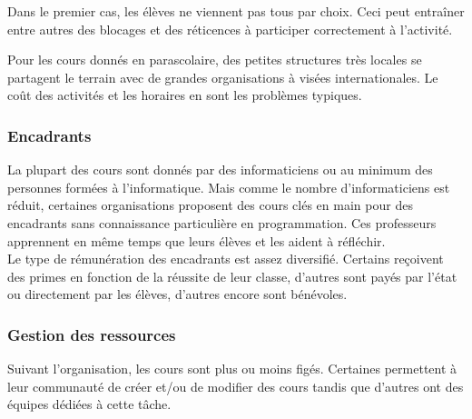 Dans le premier cas, les élèves ne viennent pas tous par choix. Ceci peut entraîner entre autres des blocages et des réticences à participer correctement à l'activité.

Pour les cours donnés en parascolaire, des petites structures très locales se partagent le terrain avec de grandes organisations à visées internationales. Le coût des activités et les horaires en sont les problèmes typiques.

\subsubsection{Encadrants}
La plupart des cours sont donnés par des informaticiens ou au minimum des personnes formées à l'informatique. Mais comme le nombre d'informaticiens est réduit, certaines organisations proposent des cours clés en main pour des encadrants sans connaissance particulière en programmation. Ces professeurs apprennent en même temps que leurs élèves et les aident à réfléchir.\\

Le type de rémunération des encadrants est assez diversifié. Certains reçoivent des primes en fonction de la réussite de leur classe, d'autres sont payés par l'état ou directement par les élèves, d'autres encore sont bénévoles.

\subsubsection{Gestion des ressources}
Suivant l'organisation, les cours sont plus ou moins figés. Certaines permettent à leur communauté de créer et/ou de modifier des cours tandis que d'autres ont des équipes dédiées à cette tâche.
